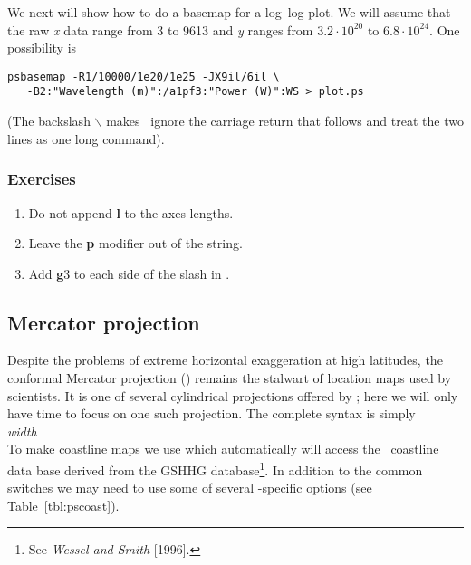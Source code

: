 \documentclass[11pt]{report}
\begin{document}
We next will show how to do a basemap for a log--log plot.  We will
assume that the raw \emph{x} data range from 3 to 9613 and \emph{y}
ranges from $3.2 \cdot 10^{20}$ to $6.8 \cdot 10^{24}$.  One possibility is

{\small\begin{verbatim} 
psbasemap -R1/10000/1e20/1e25 -JX9il/6il \
   -B2:"Wavelength (m)":/a1pf3:"Power (W)":WS > plot.ps 
\end{verbatim}
}

\noindent
(The backslash $\backslash$ makes \UNIX\ ignore the carriage return that follows and treat the two lines as one long command).

\subsubsection{Exercises}

\begin{enumerate}

\item Do not append \textbf{l} to the axes lengths.

\item Leave the \textbf{p} modifier out of the  string.

\item Add \textbf{g}3 to each side of the slash in .

\end{enumerate}

\subsection{Mercator projection}

Despite the problems of extreme horizontal exaggeration at high
latitudes, the conformal Mercator projection () remains
the stalwart of location maps used by scientists.  It is one
of several cylindrical projections offered by \GMT; here we
will only have time to focus on one such projection.  The
complete syntax is simply \\

\emph{width} \\

To make coastline maps we use  which automatically will
access the \GMT\ coastline data base derived from the GSHHG
database\footnote{See \emph{Wessel and Smith} [1996].}.  In addition
to the common switches we may need to use some of several 
-specific options (see Table~\ref{tbl:pscoast}).
\end{document}
